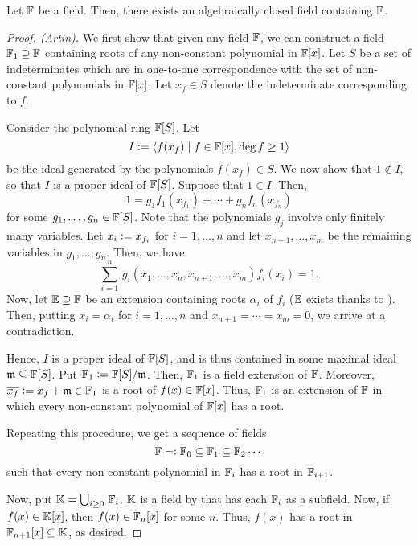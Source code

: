 \begin{theorem} \label{thm:existence-of-ACE}
    Let $\mathbb{F}$ be a field. Then, there exists an algebraically closed field containing $\mathbb{F}$.
\end{theorem}
\begin{proof}[Proof. (Artin)]
    We first show that given any field $\mathbb{F}$, we can construct a field $\mathbb{F}_1 \supseteq \mathbb{F}$ containing roots of any non-constant polynomial in $\mathbb{F}[x]$. Let $S$ be a set of indeterminates which are in one-to-one correspondence with the set of non-constant polynomials in $\mathbb{F}[x]$. Let $x_f \in S$ denote the indeterminate corresponding to $f$. 
    
    Consider the polynomial ring $\mathbb{F}[S]$. Let
    \[
        I \vcentcolon= \left\langle f(x_f) \mid f \in \mathbb{F}[x], \deg f \geq 1 \right\rangle
    \]
    be the ideal generated by the polynomials $f(x_f) \in S$. We now show that $1 \notin I$, so that $I$ is a proper ideal of $\mathbb{F}[S]$. Suppose that $1 \in I$. Then, 
    \[
        1 = g_1 f_1(x_{f_1}) + \cdots + g_n f_n(x_{f_n})
    \]
    for some $g_1, \ldots, g_n \in \mathbb{F}[S]$. Note that the polynomials $g_j$ involve only finitely many variables. Let $x_i \vcentcolon= x_{f_i}$ for $i=1,\ldots,n$ and let $x_{n+1},\ldots,x_m$ be the remaining variables in $g_1,\ldots,g_n$. Then, we have
    \[
        \sum_{i=1}^n \, g_i\left( x_1, \ldots, x_n, x_{n+1}, \ldots, x_m \right) f_i(x_i) = 1.
    \]
    Now, let $\mathbb{E} \supseteq \mathbb{F}$ be an extension containing roots $\alpha_i$ of $f_i$ ($\mathbb{E}$ exists thanks to ). Then, putting $x_i = \alpha_i$ for $i=1,\ldots,n$ and $x_{n+1}=\cdots=x_m = 0$, we arrive at a contradiction.
    
    Hence, $I$ is a proper ideal of $\mathbb{F}[S]$, and is thus contained in some maximal ideal $\mathfrak{m} \subseteq \mathbb{F}[S]$. Put $\mathbb{F}_1 \vcentcolon= \mathbb{F}[S]/\mathfrak{m}$. Then, $\mathbb{F}_1$ is a field extension of $\mathbb{F}$. Moreover, $\overline{x_f} \vcentcolon= x_f + \mathfrak{m} \in \mathbb{F}_1$ is a root of $f(x) \in \mathbb{F}[x]$. Thus, $\mathbb{F}_1$ is an extension of $\mathbb{F}$ in which every non-constant polynomial of $\mathbb{F}[x]$ has a root. 
    
    Repeating this procedure, we get a sequence of fields
    \[
        \mathbb{F} =\vcentcolon \mathbb{F}_0 \subseteq \mathbb{F}_1 \subseteq \mathbb{F}_2 \cdots
    \]
    such that every non-constant polynomial in $\mathbb{F}_i$ has a root in $\mathbb{F}_{i+1}$.
    
    Now, put $\mathbb{K} = \bigcup_{i \geq 0} \, \mathbb{F}_i$. $\mathbb{K}$ is a field by  that has each $\mathbb{F}_i$ as a subfield. Now, if $f(x) \in \mathbb{K}[x]$, then $f(x) \in \mathbb{F}_n[x]$ for some $n$. Thus, $f(x)$ has a root in $\mathbb{F}_{n+1}[x] \subseteq \mathbb{K}$, as desired.
\end{proof}

